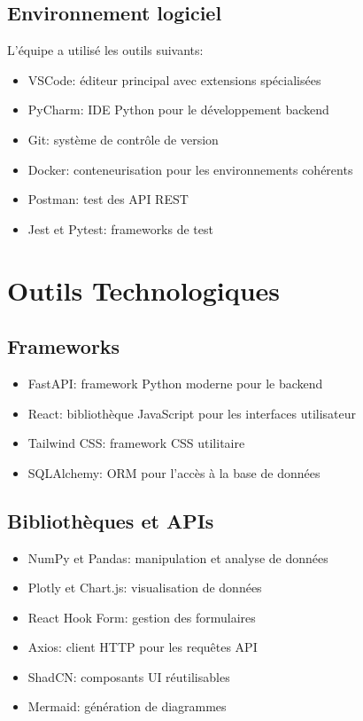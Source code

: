 \documentclass[12pt,a4paper]{report}
\begin{document}
\subsection{Environnement logiciel}
L'équipe a utilisé les outils suivants:
\begin{itemize}
    \item VSCode: éditeur principal avec extensions spécialisées
    \item PyCharm: IDE Python pour le développement backend
    \item Git: système de contrôle de version
    \item Docker: conteneurisation pour les environnements cohérents
    \item Postman: test des API REST
    \item Jest et Pytest: frameworks de test
\end{itemize}

\section{Outils Technologiques}

\subsection{Frameworks}
\begin{itemize}
    \item FastAPI: framework Python moderne pour le backend
    \item React: bibliothèque JavaScript pour les interfaces utilisateur
    \item Tailwind CSS: framework CSS utilitaire
    \item SQLAlchemy: ORM pour l'accès à la base de données
\end{itemize}

\subsection{Bibliothèques et APIs}
\begin{itemize}
    \item NumPy et Pandas: manipulation et analyse de données
    \item Plotly et Chart.js: visualisation de données
    \item React Hook Form: gestion des formulaires
    \item Axios: client HTTP pour les requêtes API
    \item ShadCN: composants UI réutilisables
    \item Mermaid: génération de diagrammes
\end{itemize}
\end{document}
